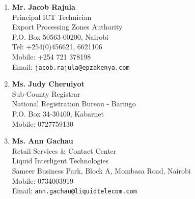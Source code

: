 \documentclass[a4paper,12pt]{moderncv}
\begin{document}
\begin{enumerate}
    \item \textbf{Mr. Jacob Rajula} \\
    Principal ICT Technician \\
    Export Processing Zones Authority \\
    P.O. Box 50563-00200, Nairobi \\
    Tel: +254(0)456621, 6621106 \\
    Mobile: +254 721 378198 \\
    Email: \texttt{jacob.rajula@epzakenya.com}
    
    \vspace{10pt} 
    
    \item \textbf{Ms. Judy Cheruiyot} \\
    Sub-County Registrar \\
    National Registration Bureau - Baringo \\
    P.O. Box 34-30400, Kabarnet \\
    Mobile: 0727759130
    
    \vspace{10pt}
    
    \item \textbf{Ms. Ann Gachau} \\
    Retail Services \& Contact Center \\
    Liquid Interligent Technologies \\
    Sameer Business Park, Block A, Mombasa Road, Nairobi \\
    Mobile: 0734003919 \\
    Email: \texttt{ann.gachau@liquidtelecom.com}
\end{enumerate}
\end{document}
